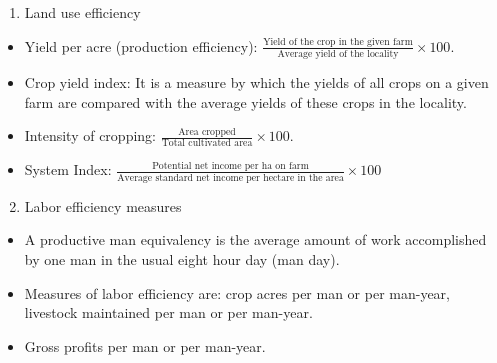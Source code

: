 \documentclass[12pt,ignorenonframetext,aspectratio=169]{beamer}
\providecommand{\tightlist}{%
  \setlength{\itemsep}{0pt}\setlength{\parskip}{0pt}}
\begin{document}
\begin{frame}{}
\protect\hypertarget{section-2}{}
\begin{enumerate}
\tightlist
\item
  Land use efficiency
\end{enumerate}

\begin{itemize}
\tightlist
\item
  Yield per acre (production efficiency):
  \(\frac{\textrm{Yield of the crop in the given farm}}{\textrm{Average yield of the locality}} \times 100\).
\item
  Crop yield index: It is a measure by which the yields of all crops on
  a given farm are compared with the average yields of these crops in
  the locality.
\item
  Intensity of cropping:
  \(\frac{\textrm{Area cropped}}{\textrm{Total cultivated area}}\times 100\).
\item
  System Index:
  \(\frac{\textrm{Potential net income per ha on farm}}{\textrm{Average standard net income per hectare in the area}} \times 100\)
\end{itemize}
\end{frame}

\begin{frame}{}
\protect\hypertarget{section-3}{}
\begin{enumerate}
\setcounter{enumi}{1}
\tightlist
\item
  Labor efficiency measures
\end{enumerate}

\begin{itemize}
\tightlist
\item
  A productive man equivalency is the average amount of work
  accomplished by one man in the usual eight hour day (man day).
\item
  Measures of labor efficiency are: crop acres per man or per man-year,
  livestock maintained per man or per man-year.
\item
  Gross profits per man or per man-year.
\end{itemize}
\end{frame}
\end{document}

